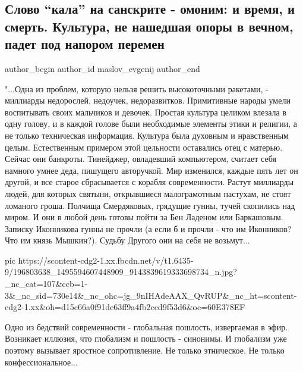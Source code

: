  
 
 
 
 
 
\subsection{Слово \enquote{кала} на санскрите - омоним: и время, и смерть. Культура, не нашедшая опоры в вечном, падет под напором перемен}
\label{sec:06_06_2021.fb.maslov_evgenij.1.shkola_pedagogika_kultura_pomeranc}
\ifcmt
 author_begin
   author_id maslov_evgenij
 author_end
\fi

"...Одна из проблем, которую нельзя решить высокоточными ракетами, - миллиарды
недорослей, недоучек, недоразвитков. Примитивные народы умели воспитывать своих
мальчиков и девочек. Простая культура целиком влезала в одну голову, и в каждой
голове были необходимые элементы этики и религии, а не только техническая
информация. Культура была духовным и нравственным целым. Естественным примером
этой цельности оставались отец с матерью. Сейчас они банкроты. Тинейджер,
овладевший компьютером, считает себя намного умнее деда, пишущего авторучкой.
Мир изменился, каждые пять лет он другой, и все старое сбрасывается с корабля
современности. Растут миллиарды людей, для которых святыни, открывшиеся
малограмотным пастухам, не стоят ломаного гроша. Полчища Смердяковых, грядущие
гунны, тучей скопились над миром. И они в любой день готовы пойти за Бен
Ладеном или Баркашовым. Записку Иконникова гунны не прочли (а если б и прочли -
что им Иконников? Что им князь Мышкин?). Судьбу Другого они на себя не
возьмут...

\ifcmt
  pic https://scontent-cdg2-1.xx.fbcdn.net/v/t1.6435-9/196803638_1495594607448909_9143839619333698734_n.jpg?_nc_cat=107&ccb=1-3&_nc_sid=730e14&_nc_ohc=jg_9nIHAdeAAX_QvRUP&_nc_ht=scontent-cdg2-1.xx&oh=d15c66a0f91de63ff9a4fb2ccd9f53d6&oe=60E378EF
\fi

Одно из бедствий современности - глобальная пошлость, извергаемая в эфир.
Возникает иллюзия, что глобализм и пошлость - синонимы. И глобализм уже поэтому
вызывает яростное сопротивление. Не только этническое. Не только
конфессиональное... 

